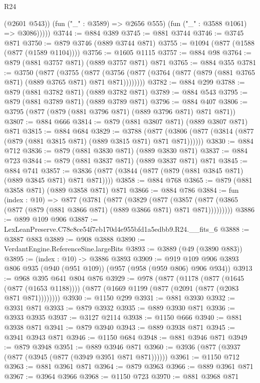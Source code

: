 \begin{lexlean}{R24}
\begin{coremodule}
              (@2601 @543))
            (fun ("_" : @3589) => @2656 @555)
            (fun ("_" : @3588 @1061) => @3086)))))
@3744 := @884 @389
@3745 := @881 @3744
@3746 := @3745 @871
@3750 := @879 @3746 (@889 @3744 @871)
@3755 := @1094 (@877 (@1588 (@877 (@1589 @1104))))
@3756 := @1605 @1115
@3757 := @884 @98
@3764 := @879 (@881 @3757 @871) (@889 @3757 @871) @871
@3765 := @884 @355
@3781 := @3750
    (@877
      (@3755
        (@877 (@3756 (@877 (@3764 (@877 (@879 (@881 @3765 @871) (@889 @3765 @871) @871 @871))))))))
@3782 := @884 @299
@3788 := @879 (@881 @3782 @871) (@889 @3782 @871)
@3789 := @884 @543
@3795 := @879 (@881 @3789 @871) (@889 @3789 @871)
@3796 := @884 @407
@3806 := @3795 (@877 (@879 (@881 @3796 @871) (@889 @3796 @871) @871 @871))
@3807 := @884 @666
@3814 := @879 (@881 @3807 @871) (@889 @3807 @871) @871
@3815 := @884 @684
@3829 := @3788
    (@877 (@3806 (@877 (@3814 (@877 (@879 (@881 @3815 @871) (@889 @3815 @871) @871 @871))))))
@3830 := @884 @712
@3836 := @879 (@881 @3830 @871) (@889 @3830 @871)
@3837 := @884 @723
@3844 := @879 (@881 @3837 @871) (@889 @3837 @871) @871
@3845 := @884 @741
@3857 := @3836 (@877 (@3844 (@877 (@879 (@881 @3845 @871) (@889 @3845 @871) @871 @871))))
@3858 := @884 @768
@3865 := @879 (@881 @3858 @871) (@889 @3858 @871) @871
@3866 := @884 @786
@3884 := fun (index : @10) =>
  @877
    (@3781
      (@877
        (@3829
          (@877
            (@3857 (@877 (@3865 (@877 (@879 (@881 @3866 @871) (@889 @3866 @871) @871 @871)))))))))
@3886 := @899 @109 @906
@3887 := LexLeanPreserve.C78c8ce54f7eb170d4e955bfd1a5edbb9.R24.__fits_6
@3888 := @3887 @883
@3889 := @908 @3888
@3890 := VerdantEngine.ReferenceSine.largeBits
@3893 := @3889 (@49 (@3890 @883))
@3895 := (index : @10) -> @3886 @3893
@3909 := @919 @109 @906 @3893 @806 @935 (@940 (@951 @109)) (@957 (@958 (@959 @806) @906 @934))
@3913 := @968 @395 @641 @804 @876
@3929 := @978
    (@877
      (@1178
        (@877 (@1645 (@877 (@1653 @1188))))
        (@877 (@1669 @1199 (@877 (@2091 (@877 (@2083 @871 @871))))))))
@3930 := @1150 @299
@3931 := @881 @3930
@3932 := @3931 @871
@3933 := @879 @3932
@3935 := @889 @3930 @871
@3936 := @3933 @3935
@3937 := @3127 @2114
@3938 := @1150 @666
@3940 := @881 @3938 @871
@3941 := @879 @3940
@3943 := @889 @3938 @871
@3945 := @3941 @3943 @871
@3946 := @1150 @684
@3948 := @881 @3946 @871
@3949 := @879 @3948
@3951 := @889 @3946 @871
@3960 := @3936 (@877 (@3937 (@877 (@3945 (@877 (@3949 @3951 @871 @871))))))
@3961 := @1150 @712
@3963 := @881 @3961 @871
@3964 := @879 @3963
@3966 := @889 @3961 @871
@3967 := @3964 @3966
@3968 := @1150 @723
@3970 := @881 @3968 @871

\end{coremodule}
\end{lexlean}
